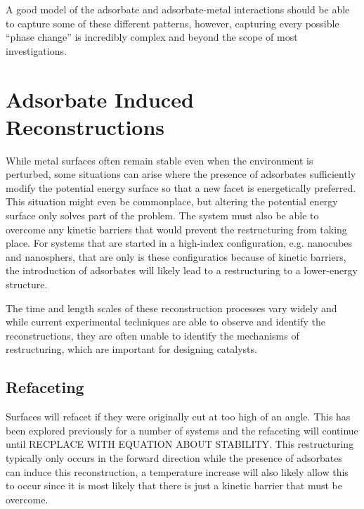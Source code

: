 A good model of the adsorbate and adsorbate-metal interactions should be able
to capture some of these different patterns, however, capturing every possible
``phase change'' is incredibly complex and beyond the scope of most
investigations.

\section{Adsorbate Induced Reconstructions}

While metal surfaces often remain stable even when the environment is
perturbed, some situations can arise where the presence of adsorbates
sufficiently modify the potential energy surface so that a new facet is
energetically preferred. This situation might even be commonplace, but altering
the potential energy surface only solves part of the problem. The system must
also be able to overcome any kinetic barriers that would prevent the
restructuring from taking place. For systems that are started in a high-index
configuration, e.g. nanocubes and nanosphers, that are only is these
configuratios because of kinetic barriers, the introduction of adsorbates will
likely lead to a restructuring to a lower-energy structure. 

The time and length scales of these reconstruction processes vary
widely\citep{} and while current experimental techniques are able to observe
and identify the reconstructions, they are often unable to identify the
mechanisms of restructuring, which are important for designing catalysts.

\subsection{Refaceting}
Surfaces will refacet if they were originally cut at too high of an angle. This
has been explored previously for a number of systems\citep{Jeong:1999aa} and the refaceting
will continue until RECPLACE WITH EQUATION ABOUT STABILITY. This restructuring
typically only occurs in the forward direction while the presence of adsorbates
can induce this reconstruction, a temperature increase will also likely allow
this to occur since it is most likely that there is just a kinetic barrier that
must be overcome. 

